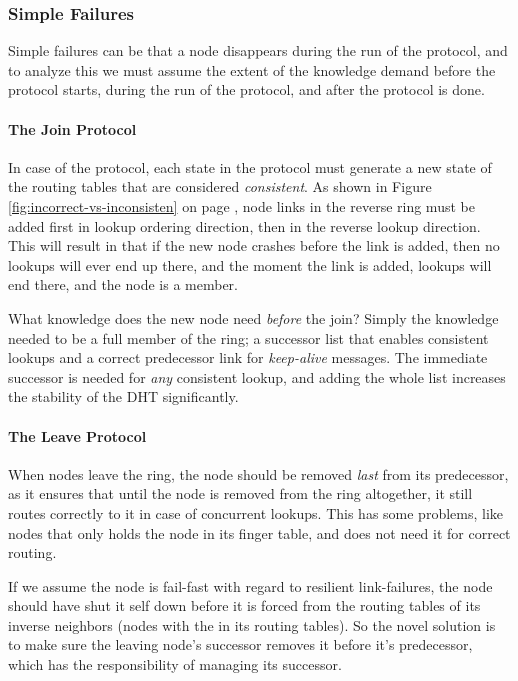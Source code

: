 \subsubsection{Simple Failures}

Simple failures can be that a node disappears during the run of the protocol, and to analyze
 this we must assume the extent of the knowledge demand before the protocol starts, during the
 run of the protocol, and after the protocol is done.

\paragraph{The Join Protocol}
In case of the  protocol, each state in the protocol
 must generate a new state of the routing tables that are considered \emph{consistent}. As shown
 in Figure \ref{fig:incorrect-vs-inconsisten} on page \pageref{fig:incorrect-vs-inconsisten},
 node links in the reverse ring must be added first in lookup ordering direction, then in the
 reverse lookup direction. This will result in that if the new node crashes before the link is added,
 then no lookups will ever end up there, and the moment the link is added, lookups will end there,
 and the node is a member.

What knowledge does the new node need \emph{before} the join? Simply the knowledge needed to
 be a full member of the ring; a successor list that enables consistent lookups and a correct
 predecessor link for \emph{keep-alive} messages. The immediate successor is needed for \emph{any}
 consistent lookup, and adding the whole list increases the stability of the DHT significantly.

\paragraph{The Leave Protocol}
When nodes leave the ring, the node should be removed \emph{last} from its predecessor, as it
 ensures that until the node is removed from the ring altogether, it still routes correctly to
 it in case of concurrent lookups. This has some problems, like nodes that only holds the node in its
 finger table, and does not need it for correct routing.

If we assume the node is fail-fast
 with regard to resilient link-failures, the node should have shut it self down before it is
 forced from the routing tables of its inverse neighbors (nodes with the  in
 its routing tables). So the novel solution is to make sure the leaving node's successor
 removes it before it's predecessor, which has the responsibility of managing its successor.

